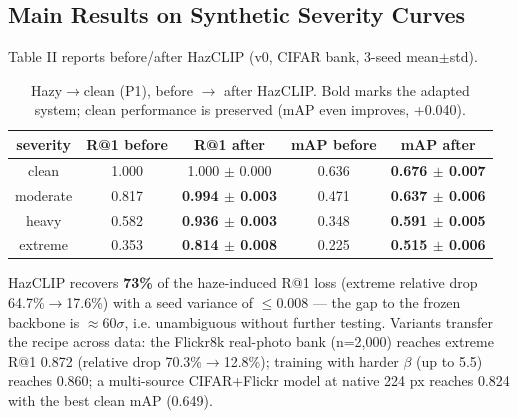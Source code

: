 \documentclass[journal]{IEEEtran}
\begin{document}
\subsection{Main Results on Synthetic Severity Curves}
Table II reports before/after HazCLIP (v0, CIFAR bank, 3-seed mean$\pm$std).
\begin{table}[!t]
\caption{Hazy$\rightarrow$clean (P1), before $\rightarrow$ after HazCLIP. Bold marks the adapted system; clean performance is preserved (mAP even improves, +0.040).}
\label{tab:hazycleanp1bef}
\centering\footnotesize\setlength{\tabcolsep}{4pt}
\begin{tabular}{@{}ccccc@{}}\toprule
\textbf{severity} & \textbf{R@1 before} & \textbf{R@1 after} & \textbf{mAP before} & \textbf{mAP after} \\
\midrule
clean & 1.000 & 1.000 $\pm$ 0.000 & 0.636 & \textbf{0.676 $\pm$ 0.007} \\
moderate & 0.817 & \textbf{0.994 $\pm$ 0.003} & 0.471 & \textbf{0.637 $\pm$ 0.006} \\
heavy & 0.582 & \textbf{0.936 $\pm$ 0.003} & 0.348 & \textbf{0.591 $\pm$ 0.005} \\
extreme & 0.353 & \textbf{0.814 $\pm$ 0.008} & 0.225 & \textbf{0.515 $\pm$ 0.006} \\
\bottomrule\end{tabular}
\end{table}
HazCLIP recovers \textbf{73\%} of the haze-induced R@1 loss (extreme relative
drop 64.7\%$\rightarrow$17.6\%) with a seed variance of $\leq$0.008 --- the gap to the frozen
backbone is $\approx$60$\sigma$, i.e. unambiguous without further testing. Variants
transfer the recipe across data: the Flickr8k real-photo bank (n=2,000)
reaches extreme R@1 0.872 (relative drop 70.3\%$\rightarrow$12.8\%); training with
harder $\beta$ (up to 5.5) reaches 0.860; a multi-source CIFAR+Flickr model at
native 224 px reaches 0.824 with the best clean mAP (0.649).
\end{document}
